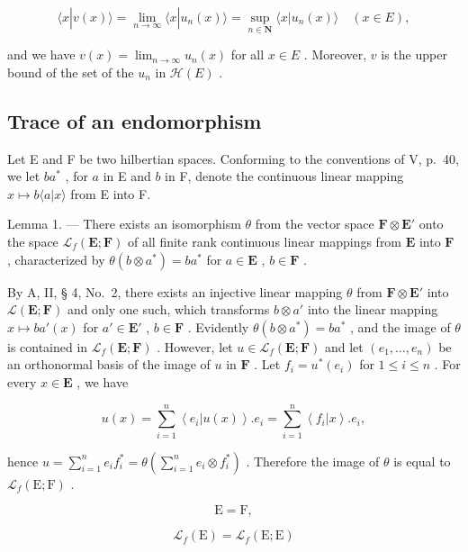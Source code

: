 \[
\langle x | v (x) \rangle = \lim _ {n \rightarrow \infty} \langle x | u _ {n} (x) \rangle = \sup _ {n \in \mathbf {N}} \langle x | u _ {n} (x) \rangle \quad (x \in E),
\]

and we have \(v(x) = \lim_{n\to \infty}u_n(x)\) for all \(x\in E\) . Moreover, \(v\) is the upper bound of the set of the \(u_{n}\) in \(\mathcal{H}(E)\) .

\subsection{Trace of an endomorphism}

Let E and F be two hilbertian spaces. Conforming to the conventions of V, p.~40, we let \(ba^{*}\) , for \(a\) in E and \(b\) in F, denote the continuous linear mapping \(x \mapsto b \langle a|x\rangle\) from E into F.

Lemma 1. --- There exists an isomorphism \(\theta\) from the vector space \(\mathbf{F} \otimes \mathbf{E}'\) onto the space \(\mathcal{L}_f(\mathbf{E}; \mathbf{F})\) of all finite rank continuous linear mappings from \(\mathbf{E}\) into \(\mathbf{F}\) , characterized by \(\theta(b \otimes a^*) = ba^*\) for \(a \in \mathbf{E}\) , \(b \in \mathbf{F}\) .

By A, II, § 4, No.~2, there exists an injective linear mapping \(\theta\) from \(\mathbf{F} \otimes \mathbf{E}'\) into \(\mathcal{L}(\mathbf{E};\mathbf{F})\) and only one such, which transforms \(b \otimes a'\) into the linear mapping \(x \mapsto ba'(x)\) for \(a' \in \mathbf{E}'\) , \(b \in \mathbf{F}\) . Evidently \(\theta(b \otimes a^*) = ba^*\) , and the image of \(\theta\) is contained in \(\mathcal{L}_f(\mathbf{E};\mathbf{F})\) . However, let \(u \in \mathcal{L}_f(\mathbf{E};\mathbf{F})\) and let \((e_1,\dots,e_n)\) be an orthonormal basis of the image of \(u\) in \(\mathbf{F}\) . Let \(f_i = u^*(e_i)\) for \(1 \leqslant i \leqslant n\) . For every \(x \in \mathbf{E}\) , we have

\[
u (x) = \sum_ {i = 1} ^ {n} \left\langle e _ {i} | u (x) \right\rangle . e _ {i} = \sum_ {i = 1} ^ {n} \left\langle f _ {i} | x \right\rangle . e _ {i},
\]

hence \(u = \sum_{i=1}^{n} e_i f_i^* = \theta(\sum_{i=1}^{n} e_i \otimes f_i^*)\) . Therefore the image of \(\theta\) is equal to \(\mathcal{L}_f(\mathrm{E};\mathrm{F})\) .

\[
\mathrm{E} = \mathrm{F},
\]

\[
\mathscr {L} _ {f} (\mathrm{E}) = \mathscr {L} _ {f} (\mathrm{E}; \mathrm{E})
\]

